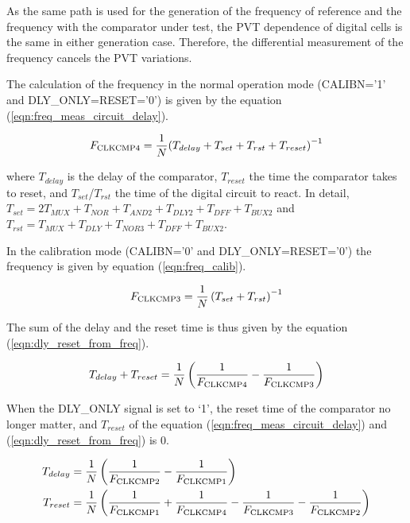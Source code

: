 As the same path is used for the generation of the frequency of reference and the frequency with the comparator under test, the PVT dependence of digital cells is the same in either generation case. Therefore, the differential measurement of the frequency cancels the PVT variations.

The calculation of the frequency in the normal operation mode (CALIBN='1' and DLY\_ONLY=RESET='0') is given by the equation (\ref{eqn:freq_meas_circuit_delay}).

\begin{equation} \label{eqn:freq_meas_circuit_delay}
F_{\rm CLKCMP4} = \frac{1}{N} {\left(T_{delay}+T_{set}+T_{rst}+T_{reset}\right)}^{-1}
\end{equation}

where $T_{delay}$ is the delay of the comparator, $T_{reset}$ the time the comparator takes to reset, and $T_{set}$/$T_{rst}$ the time of the digital circuit to react. In detail, $T_{set} = 2 T_{MUX} + T_{NOR} + T_{AND2} + T_{DLY2} + T_{DFF} + T_{BUX2}$ and $T_{rst} = T_{MUX} + T_{DLY} + T_{NOR3} + T_{DFF} + T_{BUX2}$.

In the calibration mode (CALIBN='0' and DLY\_ONLY=RESET='0') the frequency is given by equation (\ref{eqn:freq_calib}).

\begin{equation} \label{eqn:freq_calib}
F_{\rm CLKCMP3} = \frac{1}{N} \left(T_{set}+T_{rst}\right)^{-1}
\end{equation}

The sum of the delay and the reset time is thus given by the equation (\ref{eqn:dly_reset_from_freq}).

\begin{equation}
\label{eqn:dly_reset_from_freq}
T_{delay}+T_{reset} = \frac{1}{N} \left( \frac{1}{F_{\rm CLKCMP4}} - \frac{1}{F_{\rm CLKCMP3}} \right)
\end{equation}

When the DLY\_ONLY signal is set to `1', the reset time of the comparator no longer matter, and $T_{reset}$ of the equation (\ref{eqn:freq_meas_circuit_delay}) and (\ref{eqn:dly_reset_from_freq}) is 0.

\begin{eqnarray}
    \label{eqn:dly_from_freq}
    T_{delay} &= \frac{1}{N} \left( \frac{1}{F_{\rm CLKCMP2}} - \frac{1}{F_{\rm CLKCMP1}} \right) \\
    T_{reset} &= \frac{1}{N} \left( \frac{1}{F_{\rm CLKCMP1}} + \frac{1}{F_{\rm CLKCMP4}} - \frac{1}{F_{\rm CLKCMP3}} - \frac{1}{F_{\rm CLKCMP2}} \right)
\end{eqnarray}
    
